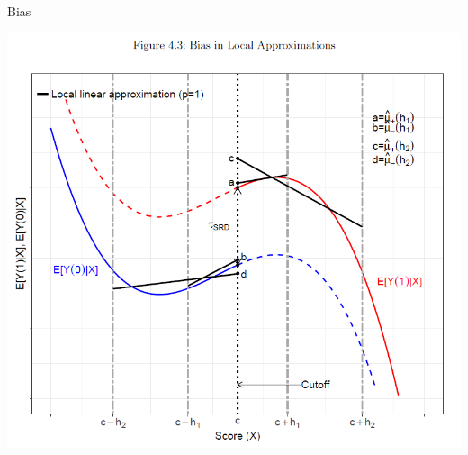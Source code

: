 \begin{frame}{Bias}
  \begin{center}
  \includegraphics[width=\textwidth]{./resources/CatteneoBias}
  \end{center}
\end{frame}


